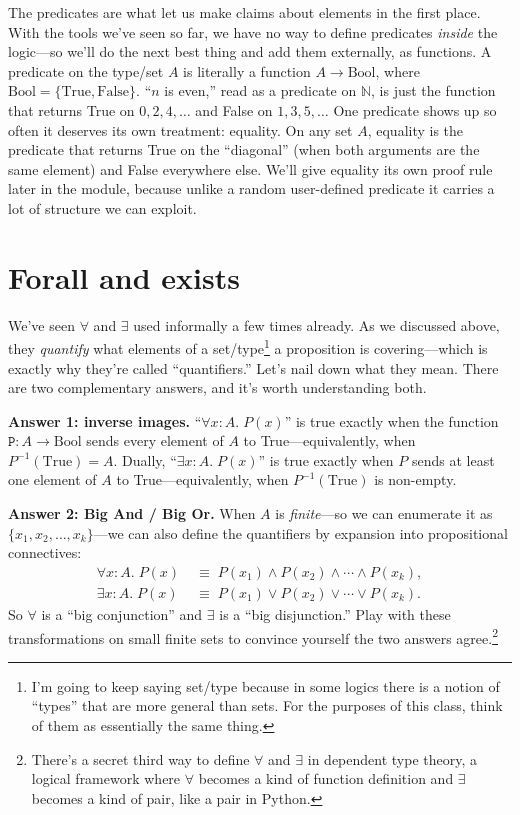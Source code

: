 \documentclass[11pt]{article}
\begin{document}
The predicates are what let us make claims about elements in the first place. With the tools we've seen so far, we have no way to define predicates \emph{inside} the logic---so we'll do the next best thing and add them externally, as functions. A predicate on the type/set $A$ is literally a function $A \to \text{Bool}$, where $\text{Bool} = \{\text{True}, \text{False}\}$. ``$n$ is even,'' read as a predicate on $\mathbb{N}$, is just the function that returns True on $0, 2, 4, \ldots$ and False on $1, 3, 5, \ldots$ One predicate shows up so often it deserves its own treatment: equality. On any set $A$, equality is the predicate that returns True on the ``diagonal'' (when both arguments are the same element) and False everywhere else. We'll give equality its own proof rule later in the module, because unlike a random user-defined predicate it carries a lot of structure we can exploit.

\section{Forall and exists}
We've seen $\forall$ and $\exists$ used informally a few times already. As we discussed above, they \emph{quantify} what elements of a set/type\footnote{I'm going to keep saying set/type because in some logics there is a notion of ``types'' that are more general than sets. For the purposes of this class, think of them as essentially the same thing.} a proposition is covering---which is exactly why they're called ``quantifiers.'' Let's nail down what they mean. There are two complementary answers, and it's worth understanding both.

\textbf{Answer 1: inverse images.} ``$\forall x : A.\; P(x)$'' is true exactly when the function $\texttt{P} : A \to \text{Bool}$ sends every element of $A$ to True---equivalently, when $P^{-1}(\text{True}) = A$. Dually, ``$\exists x : A.\; P(x)$'' is true exactly when $P$ sends at least one element of $A$ to True---equivalently, when $P^{-1}(\text{True})$ is non-empty.

\textbf{Answer 2: Big And / Big Or.} When $A$ is \emph{finite}---so we can enumerate it as $\{x_1, x_2, \ldots, x_k\}$---we can also define the quantifiers by expansion into propositional connectives:
\begin{align*}
  \forall x : A.\; P(x) &\;\equiv\; P(x_1) \wedge P(x_2) \wedge \cdots \wedge P(x_k), \\
  \exists x : A.\; P(x) &\;\equiv\; P(x_1) \vee P(x_2) \vee \cdots \vee P(x_k).
\end{align*}
So $\forall$ is a ``big conjunction'' and $\exists$ is a ``big disjunction.'' Play with these transformations on small finite sets to convince yourself the two answers agree.\footnote{There's a secret third way to define $\forall$ and $\exists$ in dependent type theory, a logical framework where $\forall$ becomes a kind of function definition and $\exists$ becomes a kind of pair, like a pair in Python.}
\end{document}
